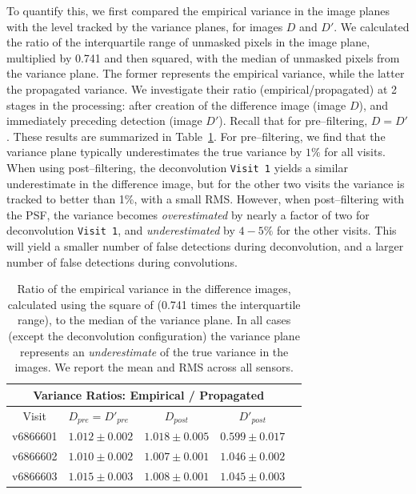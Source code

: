 \documentclass[floatfix, apj]{emulateapj}
\begin{document}
To quantify this, we first compared the empirical variance in the image planes with the level tracked by the variance planes, for images $D$ and $D'$.  
We calculated the ratio of the interquartile range of unmasked pixels in the image plane, multiplied by 0.741 and then squared, with the median of unmasked pixels from the variance plane.  
The former represents the empirical variance, while the latter the propagated variance.  
We investigate their ratio (empirical/propagated) at 2 stages in the processing: after creation of the difference image (image $D$), and immediately preceding detection (image $D'$).  
Recall that for pre--filtering, $D = D'$.  
These results are summarized in Table~\ref{tab-variance1}.  
For pre--filtering, we find that the variance plane typically underestimates the true variance by $1\%$ for all visits.  
When using post--filtering, the deconvolution {\tt Visit 1} yields a similar underestimate in the difference image, but for the other two visits the variance is tracked to better than 1\%, with a small RMS.  
However, when post--filtering with the PSF, the variance becomes {\it overestimated} by nearly a factor of two for deconvolution {\tt Visit 1}, and {\it underestimated} by $4-5\%$ for the other visits.
This will yield a smaller number of false detections during deconvolution, and a larger number of false detections during convolutions.

\begin{table}[t]
\centering
\begin{tabular}{clccc}
\hline
\multicolumn{4}{|c|}{Variance Ratios: Empirical / Propagated} \\
\hline
Visit    & $D_{pre} = D'_{pre}$ & $D_{post}$ & $D'_{post}$ \\
\hline
v6866601 &$1.012 \pm 0.002$&$1.018 \pm 0.005$&$0.599 \pm 0.017$ \\
v6866602 &$1.010 \pm 0.002$&$1.007 \pm 0.001$&$1.046 \pm 0.002$ \\
v6866603 &$1.015 \pm 0.003$&$1.008 \pm 0.001$&$1.045 \pm 0.003$ \\
\end{tabular}
\caption{Ratio of the empirical variance in the difference images,
  calculated using the square of (0.741 times the interquartile range), to the
  median of the variance plane.
  In all cases (except the deconvolution configuration) the variance plane
  represents an {\it underestimate} of the true variance in the
  images.
  We report the mean and RMS across all sensors.
}
\label{tab-variance1}
\end{table}
\end{document}
